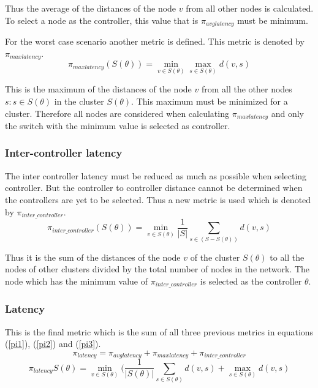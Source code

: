 \documentclass[10pt]{extarticle}
\begin{document}
	Thus the average of the distances of the node $v$ from all other nodes is calculated. To select a node as the controller, this value that is $\pi_{avglatency}$ must be minimum.
	
	For the worst case scenario another metric is defined. This metric is denoted by $\pi_{maxlatency}$.
	\begin{equation}	\label{pi2}
	\pi_{maxlatency}(S(\theta)) = \min_{v\in S(\theta)} \max_{s\in S(\theta)}d(v,s)
	\end{equation}
	
	This is the maximum of the distances of the node $v$ from all the other nodes $s:s\in S(\theta)$ in the cluster $S(\theta)$. This maximum must be minimized for a cluster. Therefore all nodes are considered when calculating $\pi_{maxlatency}$ and only the switch with the minimum value is selected as controller.
	
	\subsubsection{Inter-controller latency}
	The inter controller latency must be reduced as much as possible when selecting controller. But the controller to controller distance cannot be determined when the controllers are yet to be selected. Thus a new metric is used which is denoted by $\pi_{inter\_controller}$.
	\begin{equation}	\label{pi3}
	\pi_{inter\_controller}(S(\theta)) = \min_{v\in S(\theta)} \frac{1}{|S|} \sum_{s\in (S-S(\theta))}d(v,s)
	\end{equation}
	
	Thus it is the sum of the distances of the node $v$ of the cluster $S(\theta)$ to all the nodes of other clusters divided by the total number of nodes in the network. The node which has the minimum value of $\pi_{inter\_controller}$ is selected as the controller $\theta$.
	
	\subsubsection{Latency}
	This is the final metric which is the sum of all three previous metrics in equations (\ref{pi1}), (\ref{pi2}) and (\ref{pi3}).
	\begin{equation}
	\pi_{latency} = \pi_{avglatency} + \pi_{maxlatency} + \pi_{inter\_controller}
	\end{equation}	\label{pi4}
	\[\pi_{latency}S(\theta)=\min_{v\in S(\theta)}(\frac{1}{|S(\theta)|} \sum_{s\in S(\theta)}d(v,s) + \max_{s\in S(\theta)}d(v,s)\]
	
\end{document}
